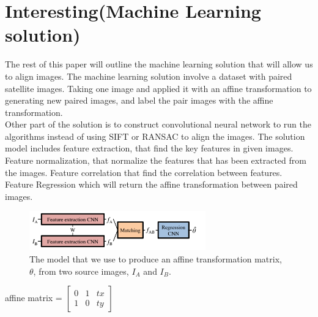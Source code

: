 \section{Interesting(Machine Learning solution)}
The rest of this paper will outline the machine learning solution that will allow us to align images.
The machine learning solution involve a dataset with paired satellite images. Taking one image and applied it with an affine transformation to generating new paired images, and label the pair images with the affine transformation.\\ 
Other part of the solution is to construct convolutional neural network to run the algorithms instead of using SIFT or RANSAC to align the images. The solution model includes feature extraction, that find the key features in given images. Feature normalization, that normalize the features that has been extracted from the images. Feature correlation that find the correlation between features. Feature Regression which will return the affine transformation between paired images.\\
\begin{figure}
\centering
\includegraphics[width=3.0in]{figs/cnn_model}
\caption{The model that we use to produce an affine transformation matrix, $\theta$, from two source images, $I_A$ and $I_B$. \cite{Rocco17}}
\end{figure}
\begin{center}
affine  matrix = $\begin{bmatrix}
0&1&tx \\
1&0&ty
\end{bmatrix}$
\end{center}

